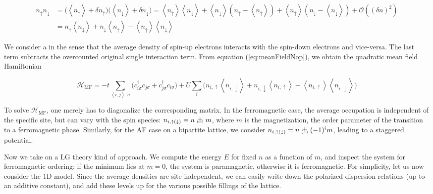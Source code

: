 \begin{equation}\label{eq:meanFieldNop}
\begin{split}
n_\uparrow n_\downarrow &= \big( \left\langle n_\uparrow \right\rangle +  \delta n_\uparrow  \big) \big( \left\langle n_\downarrow \right\rangle +  \delta n_\downarrow  \big) = \left\langle n_\uparrow \right\rangle \left\langle n_\downarrow \right\rangle + \left\langle n_\downarrow \right\rangle ( n_\uparrow - \left\langle n_\uparrow \right\rangle ) + \left\langle n_\uparrow \right\rangle ( n_\downarrow - \left\langle n_\downarrow \right\rangle ) + \mathcal{O}((\delta n)^2) \\
&= n_\uparrow \left\langle n_\downarrow \right\rangle + n_\downarrow \left\langle n_\uparrow \right\rangle - \left\langle n_\uparrow \right\rangle \left\langle n_\downarrow \right\rangle
\end{split}
\end{equation}

We consider a  in the sense that the average density of spin-up electrons interacts with the spin-down electrons and vice-versa.
The last term subtracts the overcounted original single interaction term.
From equation (\ref{eq:meanFieldNop}), we obtain the quadratic mean field Hamiltonian

\begin{equation}
\mathcal{H}_{\text{MF}} = - t \sum_{\left\langle i, j \right\rangle, \sigma} \bigg( c_{i\sigma}^\dagger c_{j\sigma} + c_{j\sigma}^\dagger c_{i\sigma} \bigg) + U \sum_i \bigg( n_{i,\uparrow} \left\langle n_{i, \downarrow} \right\rangle + n_{i, \downarrow} \left\langle n_{i, \uparrow} \right\rangle - \left\langle n_{i, \uparrow} \right\rangle \left\langle n_{i, \downarrow} \right\rangle \bigg)
\end{equation}

To solve $\mathcal{H}_{\text{MF}}$, one merely has to diagonalize the corresponding matrix.
In the ferromagnetic case, the average occupation is independent of the specific site, but can vary with the spin species: $n_{i, \uparrow(\downarrow)} = n \Pm m$, where $m$ is the magnetization, the order parameter of the transition to a ferromagnetic phase.
Similarly, for the \acs{AF} case on a bipartite lattice, we consider $n_{i, \uparrow(\downarrow)} = n \Pm (-1)^{i} m$, leading to a staggered potential.

Now we take on a \acl{LG} theory kind of approach.
We compute the energy $E$ for fixed $n$ as a function of $m$, and inspect the system for ferromagnetic ordering: if the minimum lies at $m = 0$, the system is paramagnetic, otherwise it is ferromagnetic.
For simplicity, let us now consider the \acs{1D} model.
Since the average densities are site-independent, we can easily write down the polarized dispersion relations (up to an additive constant), and add these levels up for the various possible fillings of the lattice.

